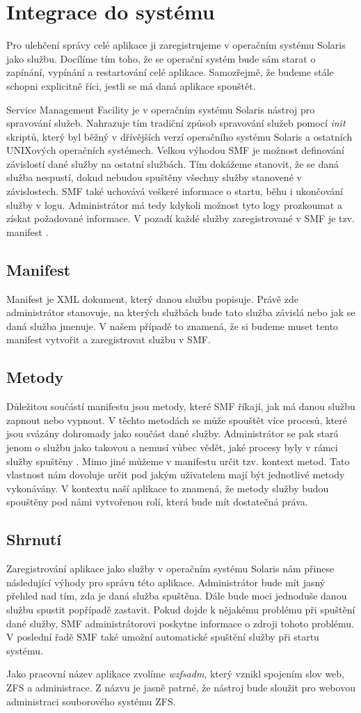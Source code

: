 \section{Integrace do systému}
Pro ulehčení správy celé aplikace ji zaregistrujeme v operačním systému Solaris jako službu. Docílíme tím toho, že se operační systém bude sám starat o zapínání, vypínání a restartování celé aplikace. Samozřejmě, že budeme stále schopni explicitně říci, jestli se má daná aplikace spouštět.

Service Management Facility je v operačním systému Solaris nástroj pro spravování služeb. Nahrazuje tím tradiční způsob spravování služeb pomocí \emph{init} skriptů, který byl běžný v dřívějších verzí operačního systému Solaris a ostatních UNIXových operačních systémech. Velkou výhodou SMF je možnost definování závislostí dané služby na ostatní službách. Tím dokážeme stanovit, že se daná služba nespustí, dokud nebudou spuštěny všechny služby stanovené v závislostech. SMF také uchovává veškeré informace o startu, běhu i ukončování služby v logu. Administrátor má tedy kdykoli možnost tyto logy prozkoumat a získat požadované informace. V pozadí každé služby zaregistrované v SMF je tzv. manifest \cite{SMF}.
    \subsection{Manifest}
    Manifest je XML dokument, který danou službu popisuje. Právě zde administrátor stanovuje, na kterých službách bude tato služba závislá nebo jak se daná služba jmenuje. V našem případě to znamená, že si budeme muset tento manifest vytvořit a zaregistrovat službu v SMF.
    \subsection{Metody}
    Důležitou součástí manifestu jsou metody, které SMF říkají, jak má danou službu zapnout nebo vypnout. V těchto metodách se může spouštět více procesů, které jsou svázány dohromady jako součást dané služby. Administrátor se pak stará jenom o službu jako takovou a nemusí vůbec vědět, jaké procesy byly v rámci služby spuštěny \cite{SMF}. Mimo jiné můžeme v manifestu určit tzv. kontext metod. Tato vlastnost nám dovoluje určit pod jakým uživatelem mají být jednotlivé metody vykonávány. V kontextu naší aplikace to znamená, že metody služby budou spouštěny pod námi vytvořenou rolí, která bude mít dostatečná práva.
    \subsection{Shrnutí}
    Zaregistrování aplikace jako služby v operačním systému Solaris nám přinese následující výhody pro správu této aplikace. Administrátor bude mít jasný přehled nad tím, zda je daná služba spuštěna. Dále bude moci jednoduše danou službu spustit popřípadě zastavit. Pokud dojde k nějakému problému při spuštění dané služby, SMF administrátorovi poskytne informace o zdroji tohoto problému. V poslední řadě SMF také umožní automatické spuštění služby při startu systému.

    Jako pracovní název aplikace zvolíme \emph{wzfsadm}, který vznikl spojením slov web, ZFS a administrace. Z názvu je jasně patrné, že nástroj bude sloužit pro webovou administraci souborového systému ZFS.



